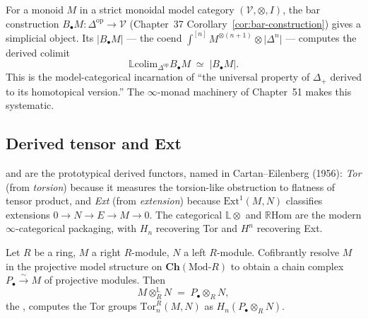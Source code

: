 \begin{example_thm}
\label{ex:derived-bar}
For a monoid $M$ in a strict monoidal model category $(\mathcal{V},
\otimes, I)$, the bar construction $B_\bullet M : \Delta^{\mathrm{op}}
\to \mathcal{V}$ (Chapter~37 Corollary~\ref{cor:bar-construction})
gives a simplicial object. Its 
$\lvert B_\bullet M\rvert$ — the coend $\int^{[n]} M^{\otimes(n+1)} \otimes
\lvert\Delta^n\rvert$ — computes the derived colimit
\begin{equation*}
  \mathbb{L}\mathrm{colim}_{\Delta^{\mathrm{op}}} B_\bullet M \;\simeq\; \lvert B_\bullet M\rvert.
\end{equation*}
This is the model-categorical incarnation of ``the universal property of
$\Delta_+$ derived to its homotopical version.'' The $\infty$-monad
machinery of Chapter~51 makes this systematic.
\end{example_thm}

\subsection{Derived tensor and Ext}

\begin{nameorigin}
 and  are the prototypical derived functors,
named in Cartan--Eilenberg (1956): \emph{Tor} (from \emph{torsion})
because it measures the torsion-like obstruction to flatness of
tensor product, and \emph{Ext} (from \emph{extension}) because
$\mathrm{Ext}^1(M, N)$ classifies extensions $0 \to N \to E \to M \to 0$.
The categorical $\mathbb{L} \otimes$ and $\mathbb{R} \mathrm{Hom}$ are
the modern $\infty$-categorical packaging, with $H_n$ recovering Tor
and $H^n$ recovering Ext.
\end{nameorigin}

\begin{example_thm}
\label{ex:derived-tensor}
Let $R$ be a ring, $M$ a right $R$-module, $N$ a left $R$-module.
Cofibrantly resolve $M$ in the projective model structure on
$\mathbf{Ch}(\mathrm{Mod}\text{-}R)$ to obtain a chain complex
$P_\bullet \xrightarrow{\sim} M$ of projective modules. Then
\begin{equation*}
  M \otimes^{\mathbb{L}}_R N \;=\; P_\bullet \otimes_R N,
\end{equation*}
the , computes the Tor groups $\mathrm{Tor}_n^R(M, N)$
as $H_n(P_\bullet \otimes_R N)$.
\end{example_thm}

